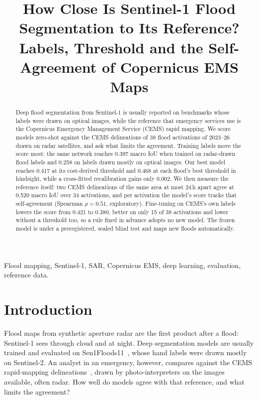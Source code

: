 \documentclass[conference]{IEEEtran}
\begin{document}
\title{How Close Is Sentinel-1 Flood Segmentation to Its Reference?\\
Labels, Threshold and the Self-Agreement of Copernicus EMS Maps}

\author{
}

\maketitle

\begin{abstract}
Deep flood segmentation from Sentinel-1 is usually reported on benchmarks whose labels were drawn on optical images,
while the reference that emergency services use is the Copernicus Emergency Management Service (CEMS) rapid mapping.
We score models zero-shot against the CEMS delineations of 38 flood activations of 2023--26 drawn on radar
satellites, and ask what limits the agreement. Training labels move the score most: the same network reaches 0.397
macro IoU when trained on radar-drawn flood labels and 0.258 on labels drawn mostly on optical images. Our best model
reaches 0.417 at its cost-derived threshold and 0.468 at each flood's best threshold in hindsight, while a
cross-fitted recalibration gains only 0.002. We then measure the reference itself: two CEMS delineations of the same
area at most 24\,h apart agree at 0.520 macro IoU over 34 activations, and per activation the model's score tracks
that self-agreement (Spearman $\rho = 0.51$, exploratory). Fine-tuning on CEMS's own labels lowers the score from
0.421 to 0.380, better on only 15 of 38 activations and lower without a threshold too, so a rule fixed in advance
adopts no new model. The frozen model is under a preregistered, sealed blind test and maps new floods
automatically.
\end{abstract}

\begin{IEEEkeywords}
Flood mapping, Sentinel-1, SAR, Copernicus EMS, deep learning, evaluation, reference data.
\end{IEEEkeywords}

\section{Introduction}
Flood maps from synthetic aperture radar are the first product after a flood: Sentinel-1 sees through cloud and at
night. Deep segmentation models are usually trained and evaluated on Sen1Floods11~\cite{bonafilia2020sen1floods11},
whose hand labels were drawn mostly on Sentinel-2. An analyst in an emergency, however, compares against the CEMS
rapid-mapping delineations~\cite{cems2026rapidmapping}, drawn by photo-interpreters on the images available, often
radar. How well do models agree with that reference, and what limits the agreement?
\end{document}
